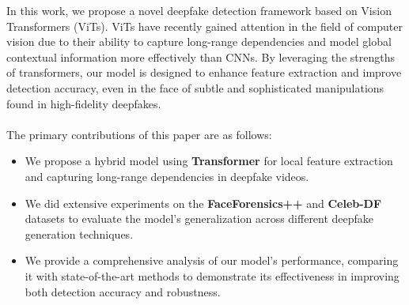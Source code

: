 In this work, we propose a novel deepfake detection framework based on Vision Transformers (ViTs). ViTs have recently gained attention in the field of computer vision due to their ability to capture long-range dependencies and model global contextual information more effectively than CNNs. By leveraging the strengths of transformers, our model is designed to enhance feature extraction and improve detection accuracy, even in the face of subtle and sophisticated manipulations found in high-fidelity deepfakes.\\\\
The primary contributions of this paper are as follows:
\begin{itemize}
    \item We propose a hybrid model using \textbf{Transformer} for local feature extraction and capturing long-range dependencies in deepfake videos.
    \item We did extensive experiments on the \textbf{FaceForensics++} and \textbf{Celeb-DF} datasets to evaluate the model’s generalization across different deepfake generation techniques.
    \item We provide a comprehensive analysis of our model’s performance, comparing it with state-of-the-art methods to demonstrate its effectiveness in improving both detection accuracy and robustness.
\end{itemize}